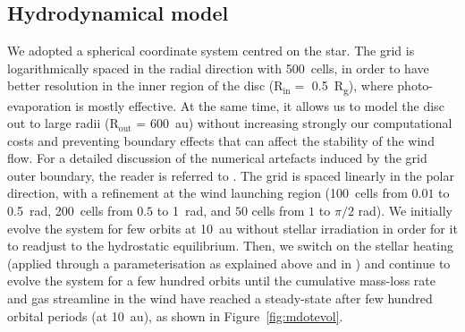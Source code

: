 \documentclass[usenatbib,useAMS,usedcolumn]{mnras}
\begin{document}
\subsection{Hydrodynamical model}\label{sec:hydro-model}

We adopted a spherical coordinate system centred on the star.
The grid is logarithmically spaced in the radial direction with \SI{500}{cells}, in order to have better resolution in the inner region of the disc (R$_\mathrm{in}=$ \SI{0.5}{R_g}), where photo-evaporation is mostly effective.
At the same time, it allows us to model the disc out to large radii (R$_\mathrm{out}$ = \SI{600}{\astronomicalunit}) without increasing strongly our computational costs and preventing boundary effects that can affect the stability of the wind flow.
For a detailed discussion of the numerical artefacts induced by the grid outer boundary, the reader is referred to .
The grid is spaced linearly in the polar direction, with a refinement at the wind launching region (\SI{100}{cells} from $0.01$ to \SI{0.5}{rad}, \SI{200}{cells} from $0.5$ to \SI{1}{rad}, and $50$ cells from $1$ to $\pi / 2$ rad).
We initially evolve the system for few orbits at \SI{10}{au} without stellar irradiation in order for it to readjust to the hydrostatic equilibrium. Then, we switch on the stellar heating (applied through a parameterisation as explained above and in ) and continue to evolve the system for a few hundred orbits until the cumulative mass-loss rate and gas streamline in the wind have reached a steady-state after few hundred orbital periods (at \SI{10}{au}), as shown in Figure~\ref{fig:mdotevol}.
\end{document}
